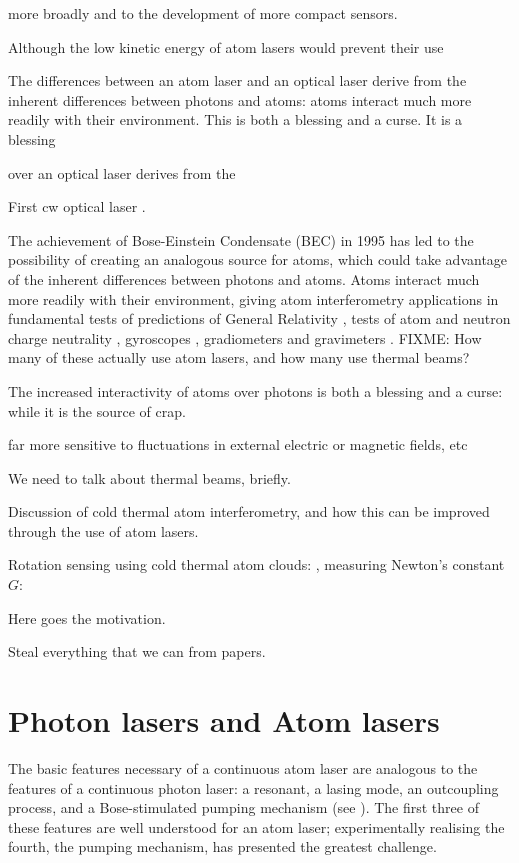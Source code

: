 more broadly and to the development of more compact sensors.  




Although the low kinetic energy of atom lasers would prevent their use 


The differences between an atom laser and an optical laser derive from the inherent differences between photons and atoms: atoms interact much more readily with their environment.  This is both a blessing and a curse.  It is a blessing

 over an optical laser derives from the 



First cw optical laser \citep{Javan:1961}.


The achievement of Bose-Einstein Condensate (BEC) in 1995 \citep{Anderson:1995vn,Bradley:1995ys,Davis:1995} has led to the possibility of creating an analogous source for atoms, which could take advantage of the inherent differences between photons and atoms.  Atoms interact much more readily with their environment, giving atom interferometry applications in fundamental tests of predictions of General Relativity \citep{Dimopoulos:2007uq}, tests of atom and neutron charge neutrality \citep{Arvanitaki:2008}, gyroscopes \citep{Gustavson:1997}, gradiometers \citep{Snadden:1998,McGuirk:2002} and gravimeters \citep{Peters:2001}.  FIXME: How many of these actually use atom lasers, and how many use thermal beams?

The increased interactivity of atoms over photons is both a blessing and a curse: while it is the source of crap.

far more sensitive to fluctuations in external electric or magnetic fields, etc


We need to talk about thermal beams, briefly.

Discussion of cold thermal atom interferometry, and how this can be improved through the use of atom lasers. 

Rotation sensing using cold thermal atom clouds: \citep{Canuel:2006}, measuring Newton's constant $G$: \citep{Lamporesi:2008}


Here goes the motivation.

Steal everything that we can from papers.

\section{Photon lasers and Atom lasers}

The basic features necessary of a continuous atom laser are analogous to the features of a continuous photon laser: a resonant, a lasing mode, an outcoupling process, and a Bose-stimulated pumping mechanism (see ).  The first three of these features are well understood for an atom laser; experimentally realising the fourth, the pumping mechanism, has presented the greatest challenge.

